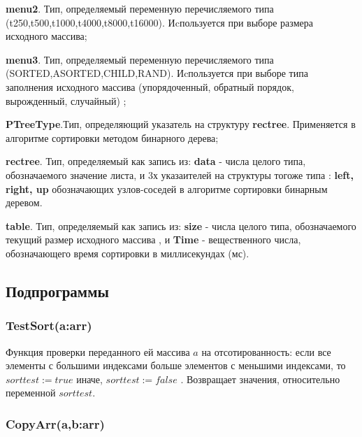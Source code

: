 \documentclass[a4paper,11pt]{article}
\begin{document}
\linebreak 
{\bf menu2}.  Тип, определяемый переменную перечисляемого типа (t250,t500,t1000,t4000,t8000,t16000). Иcпользуется
при выборе размера исходного массива;

\linebreak
{\bf menu3}.  Тип, определяемый переменную перечисляемого типа (SORTED,ASORTED,CHILD,RAND). Иcпользуется
при выборе типа заполнения исходного массива (упорядоченный, обратный порядок, вырожденный, случайный) ;

\linebreak 
{\bf PTreeType}.Тип, определяющий указатель на структуру {\bf rectree}. 
Применяется в алгоритме сортировки методом бинарного дерева;

\linebreak 
{\bf rectree}. Тип, определяемый как запись из: {\bf data} - числа целого типа, обозначаемого значение листа, и 3х указаителей на структуры тогоже типа : {\bf left, right, up} обозначающих узлов-соседей в алгоритме сортировки бинарным деревом.

\linebreak 
{\bf table}. Тип, определяемый как запись из: {\bf size} - числа целого типа, обозначаемого текущий  размер исходного массива , и {\bf Time} - вещественного числа, обозначающего время сортировки в миллисекундах (мс).
\\

\begin{center}
\subsection{Подпрограммы}
\end{center}
\begin{center}
\subsubsection{TestSort(a:arr)}
\end{center}

Функция проверки переданного ей массива $a$ на отсотированность: если все элементы с большими индексами больше
элементов с меньшими индексами, то $sorttest :=true$ иначе,  $sorttest :=false$ . Возвращает значения, относительно переменной $sorttest$.
\\
\begin{center}
\subsubsection{CopyArr(a,b:arr)}
\end{center}
\end{document}
